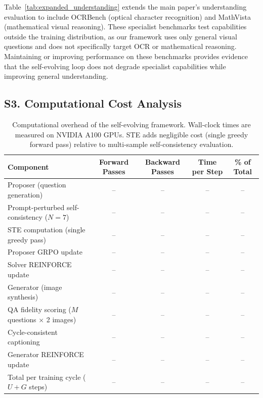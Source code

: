 Table~\ref{tab:expanded_understanding} extends the main paper's understanding evaluation to include OCRBench (optical character recognition) and MathVista (mathematical visual reasoning). These specialist benchmarks test capabilities outside the training distribution, as our framework uses only general visual questions and does not specifically target OCR or mathematical reasoning. Maintaining or improving performance on these benchmarks provides evidence that the self-evolving loop does not degrade specialist capabilities while improving general understanding.


\subsection*{S3. Computational Cost Analysis}
\label{sec:sup_cost}


\begin{table}[tb]
  \caption{Computational overhead of the self-evolving framework. Wall-clock times are measured on NVIDIA A100 GPUs. STE adds negligible cost (single greedy forward pass) relative to multi-sample self-consistency evaluation.}
  \label{tab:computational_cost}
  \centering
  \small
  \begin{tabular}{lcccc}
    \toprule
    Component & Forward Passes & Backward Passes & Time per Step & \% of Total \\
    \midrule
    Proposer (question generation) & -- & -- & -- & -- \\
    Prompt-perturbed self-consistency ($N{=}7$) & -- & -- & -- & -- \\
    STE computation (single greedy pass) & -- & -- & -- & -- \\
    Proposer GRPO update & -- & -- & -- & -- \\
    Solver REINFORCE update & -- & -- & -- & -- \\
    \midrule
    Generator (image synthesis) & -- & -- & -- & -- \\
    QA fidelity scoring ($M$ questions $\times$ 2 images) & -- & -- & -- & -- \\
    Cycle-consistent captioning & -- & -- & -- & -- \\
    Generator REINFORCE update & -- & -- & -- & -- \\
    \midrule
    Total per training cycle ($U{+}G$ steps) & -- & -- & -- & -- \\
    \bottomrule
  \end{tabular}
\end{table}

